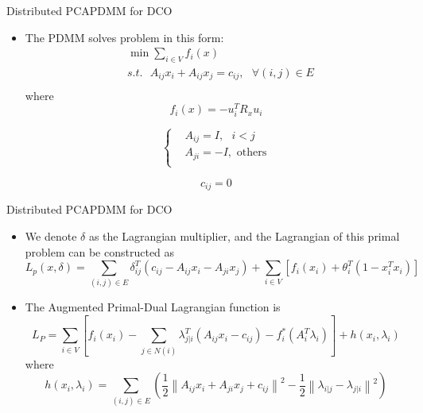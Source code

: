 \documentclass{beamer}
\begin{document}
\begin{frame}{Distributed PCA}{PDMM for DCO}
\begin{itemize}
\item{
The PDMM \cite{8} solves problem in this form:
\begin{equation}
  \begin{align}
  & \min \sum\limits_{i\in V}{{{f}_{i}}(x)} \\ 
 & s.t.\text{ }{{A}_{ij}}{{x}_{i}}+{{A}_{ij}}{{x}_{j}}={{c}_{ij}},\text{ }\forall (i,j)\in E \\ 
\end{align}
\end{equation}
where 
\begin{equation}
  {{f}_{i}}(x)=-u_{i}^{T}{{R}_{x}}{{u}_{i}}
\end{equation}

\begin{equation}
\left\{ \begin{align}
  & {{A}_{ij}}=I,\text{ }i<j \\ 
 & {{A}_{ji}}=-I,\text{ others} \\ 
\end{align} \right.
\end{equation}
}
\begin{equation}
{{c}_{ij}}=0
\end{equation}

\end{itemize}
\end{frame}

\begin{frame}{Distributed PCA}{PDMM for DCO}
\begin{itemize}
\item{
	We denote $\delta $ as the Lagrangian multiplier, and the Lagrangian of this primal problem can be constructed as
\begin{equation}
{{L}_{p}}(x,\delta )=\sum\limits_{(i,j)\in E}{\delta _{ij}^{T}({{c}_{ij}}-{{A}_{ij}}{{x}_{i}}-{{A}_{ji}}{{x}_{j}})}+\sum\limits_{i\in V}{\left[ {{f}_{i}}({{x}_{i}})+\theta _{i}^{T}(1-x_{i}^{T}{{x}_{i}}) \right]}	
\end{equation}
}

\item{
	The Augmented Primal-Dual Lagrangian function is
\begin{equation}
{{L}_{P}}=\sum\limits_{i\in V}{\left[ {{f}_{i}}({{x}_{i}})-\sum\limits_{j\in N(i)}{\lambda _{j|i}^{T}({{A}_{ij}}{{x}_{i}}-{{c}_{ij}})}-f_{i}^{*}(A_{i}^{T}{{\lambda }_{i}}) \right]}+h({{x}_{i}},{{\lambda }_{i}})  
\end{equation}
where
\begin{equation}
h({{x}_{i}},{{\lambda }_{i}})=\sum\limits_{(i,j)\in E}{(\frac{1}{2}{{\left\| {{A}_{ij}}{{x}_{i}}+{{A}_{ji}}{{x}_{j}}+{{c}_{ij}} \right\|}^{2}}-\frac{1}{2}{{\left\| {{\lambda }_{i|j}}-{{\lambda }_{j|i}} \right\|}^{2}})}
\end{equation}
}
\end{itemize}
\end{frame}
\end{document}

